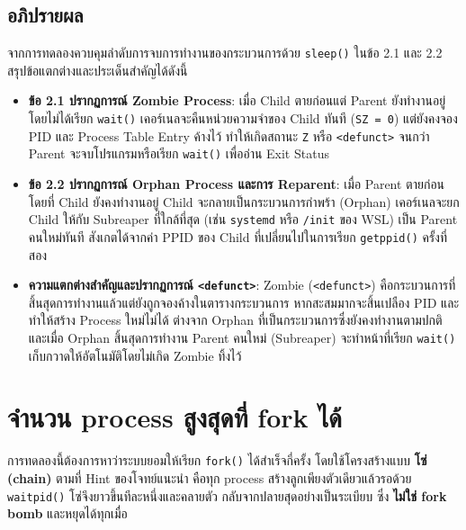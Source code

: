 \documentclass[a4paper,12pt]{article}
\newcommand{\code}[1]{\texttt{#1}}
\begin{document}
\newpage

\subsection{อภิปรายผล}

จากการทดลองควบคุมลำดับการจบการทำงานของกระบวนการด้วย \code{sleep()} ในข้อ 2.1 และ 2.2 สรุปข้อแตกต่างและประเด็นสำคัญได้ดังนี้

\begin{itemize}[leftmargin=*]
  \item \textbf{ข้อ 2.1 ปรากฏการณ์ Zombie Process}:
        เมื่อ Child ตายก่อนแต่ Parent ยังทำงานอยู่โดยไม่ได้เรียก \code{wait()} เคอร์เนลจะคืนหน่วยความจำของ Child ทันที (\code{SZ = 0}) แต่ยังคงจอง PID และ Process Table Entry ค้างไว้ ทำให้เกิดสถานะ \code{Z} หรือ \code{<defunct>} จนกว่า Parent จะจบโปรแกรมหรือเรียก \code{wait()} เพื่ออ่าน Exit Status

  \item \textbf{ข้อ 2.2 ปรากฏการณ์ Orphan Process และการ Reparent}:
        เมื่อ Parent ตายก่อนโดยที่ Child ยังคงทำงานอยู่ Child จะกลายเป็นกระบวนการกำพร้า (Orphan) เคอร์เนลจะยก Child ให้กับ Subreaper ที่ใกล้ที่สุด (เช่น \code{systemd} หรือ \code{/init} ของ WSL) เป็น Parent คนใหม่ทันที สังเกตได้จากค่า PPID ของ Child ที่เปลี่ยนไปในการเรียก \code{getppid()} ครั้งที่สอง

  \item \textbf{ความแตกต่างสำคัญและปรากฏการณ์ \code{<defunct>}}:
        Zombie (\code{<defunct>}) คือกระบวนการที่สิ้นสุดการทำงานแล้วแต่ยังถูกจองค้างในตารางกระบวนการ หากสะสมมากจะสิ้นเปลือง PID และทำให้สร้าง Process ใหม่ไม่ได้ ต่างจาก Orphan ที่เป็นกระบวนการซึ่งยังคงทำงานตามปกติ และเมื่อ Orphan สิ้นสุดการทำงาน Parent คนใหม่ (Subreaper) จะทำหน้าที่เรียก \code{wait()} เก็บกวาดให้อัตโนมัติโดยไม่เกิด Zombie ทิ้งไว้
\end{itemize}
\newpage
\section{จำนวน process สูงสุดที่ fork ได้}

การทดลองนี้ต้องการหาว่าระบบยอมให้เรียก \code{fork()} ได้สำเร็จกี่ครั้ง
โดยใช้โครงสร้างแบบ \textbf{โซ่ (chain)} ตามที่ Hint ของโจทย์แนะนำ คือทุก process
สร้างลูกเพียงตัวเดียวแล้วรอด้วย \code{waitpid()} โซ่จึงยาวขึ้นทีละหนึ่งและคลายตัว
กลับจากปลายสุดอย่างเป็นระเบียบ ซึ่ง \textbf{ไม่ใช่ fork bomb} และหยุดได้ทุกเมื่อ
\end{document}
